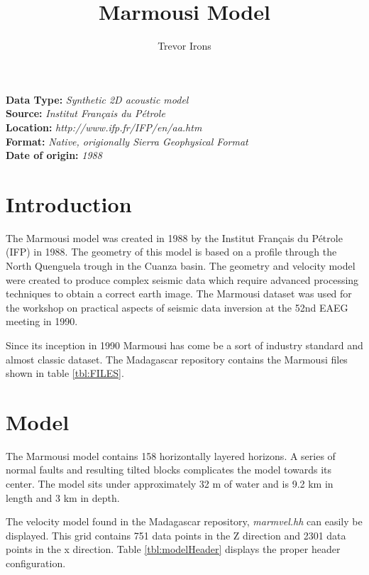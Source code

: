 \title{Marmousi Model}
\author{Trevor Irons}
\lstset{language=python,numbers=left,numberstyle=\tiny,showstringspaces=false}

\maketitle
\noindent
\textbf {Data Type:} \emph{Synthetic 2D acoustic model}\\
\textbf {Source:} \emph{Institut Fran\c{c}ais du P\'{e}trole}\\
\textbf {Location:} \emph{http://www.ifp.fr/IFP/en/aa.htm}\\
\textbf {Format:} \emph{Native, origionally Sierra Geophysical Format} \\
\textbf{Date of origin:} \emph{1988}\\

\section{Introduction}
The Marmousi model was created in 1988 by the Institut Fran\c{c}ais du P\'{e}trole (IFP) in 1988.  The geometry of this model is based on a 
profile through the North Quenguela trough in the Cuanza basin. The geometry and velocity model were created to produce complex seismic data 
which require advanced processing techniques to obtain a correct earth image. The Marmousi dataset was used for the workshop on practical 
aspects of seismic data inversion at the 52nd EAEG meeting in 1990.

Since its inception in 1990 Marmousi has come be a sort of industry standard and almost classic dataset. The Madagascar repository contains 
the Marmousi files shown in table \ref{tbl:FILES}.

{
\tiny

\normalsize
}

\section{Model}
The Marmousi model contains 158 horizontally layered horizons.  A series of normal faults and resulting tilted blocks complicates the model towards its center.  The model sits under approximately 32 m of water and is 9.2 km in length and 3 km in depth.  

The velocity model found in the Madagascar repository, \emph{marmvel.hh} can easily be displayed.  This grid contains 751 data points in the Z direction and 2301 data points in the x direction.  Table \ref{tbl:modelHeader} displays the proper header configuration.  

